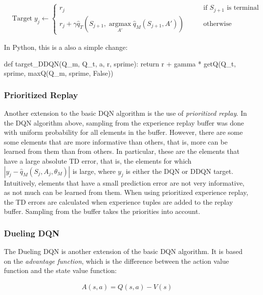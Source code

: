 \begin{align*}
& \text{Target}\;y_j \leftarrow \begin{cases} r_j & \qquad \text{if $S_{j+1}$ is terminal} \\
r_j + \gamma \hat{q}_T (S_{j+1}, \operatorname*{argmax}_{A'} \hat{q}_M (S_{j+1}, A') ) & \qquad \text{otherwise}\end{cases} \hspace{1in}
\end{align*}

In Python, this is a also a simple change:

\begin{pythoncode}
def target_DDQN(Q_m, Q_t, a, r, sprime):
    return r + gamma * getQ(Q_t, sprime, maxQ(Q_m, sprime, False))
\end{pythoncode}

\subsubsection*{Prioritized Replay}

Another extension to the basic DQN algorithm is the use of \emph{prioritized replay}. In the DQN algorithm above, sampling from the experience replay buffer was done with uniform probability for all elements in the buffer. However, there are some some elements that are more informative than others, that is, more can be learned from them than from others. In particular, these are the elements that have a large absolute TD error, that is, the elements for which $|y_j - \hat{q}_M (S_j, A_j, \theta_M)|$ is large, where $y_j$ is either the DQN or DDQN target. Intuitively, elements that have a small prediction error are not very informative, as not much can be learned from them. When using prioritized experience replay, the TD errors are calculated when experience tuples are added to the replay buffer. Sampling from the buffer takes the priorities into account. 

\subsubsection*{Dueling DQN}

The Dueling DQN is another extension of the basic DQN algorithm. It is based on the \emph{advantage function}, which is the difference between the action value function and the state value function:


\begin{align*}
A(s, a) = Q(s, a) - V(s)
\end{align*}

